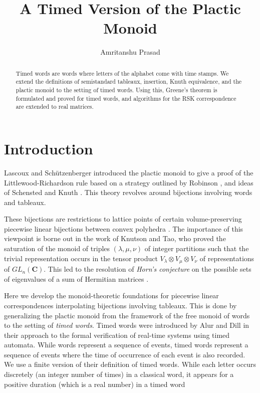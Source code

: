 \documentclass[10pt]{amsproc}
\title{A Timed Version of the Plactic Monoid}
\author{Amritanshu Prasad}
\theoremstyle{definition}
\theoremstyle{remark}
\begin{document}
\begin{abstract}
  Timed words are words where letters of the alphabet come with time stamps.
  We extend the definitions of semistandard tableaux, insertion, Knuth equivalence, and the plactic monoid to the setting of timed words.
  Using this, Greene's theorem is formulated and proved for timed words, and algorithms for the RSK correspondence are extended to real matrices.
\end{abstract}
\maketitle
\section{Introduction}
Lascoux and Sch\"utzenberger \cite{plaxique} introduced the plactic monoid to give a proof of the Littlewood-Richardson rule based on a strategy outlined by Robinson \cite{robinson-algo}, and ideas of Schensted \cite{schensted} and Knuth \cite{knuth}.
This theory revolves around bijections involving words and tableaux.

These bijections are restrictions to lattice points of certain volume-preserving piecewise linear bijections between convex polyhedra \cite{berkir,kir-trop,DeLoera2004,pak}.
The importance of this viewpoint is borne out in the work of Knutson and Tao, who proved the saturation of the monoid of triples $(\lambda, \mu, \nu)$ of integer partitions such that the trivial representation occurs in the tensor product $V_\lambda\otimes V_\mu\otimes V_\nu$ of representations of $GL_n(\mathbf C)$.
This led to the resolution of \emph{Horn's conjecture} on the possible sets of eigenvalues of a sum of Hermitian matrices \cite{knutsontaojams,knutsontaonotices}.

Here we develop the monoid-theoretic foundations for piecewise linear correspondences interpolating bijections involving tableaux.
This is done by generalizing the plactic monoid from the framework of the free monoid of words to the setting of \emph{timed words}.
Timed words were introduced by Alur and Dill \cite{alur-dill} in their approach to the formal verification of real-time systems using timed automata.
While words represent a sequence of events, timed words represent a sequence of events where the time of occurrence of each event is also recorded.
We use a finite version of their definition of timed words.
While each letter occurs discretely (an integer number of times) in a classical word, it appears for a positive duration (which is a real number) in a timed word 
\end{document}
